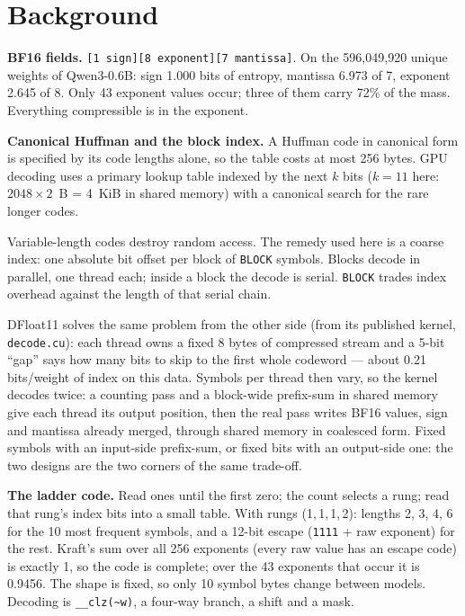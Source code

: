 \documentclass[11pt,a4paper]{article}
\newcommand{\code}[1]{\texttt{#1}}
\newcommand{\B}[1]{\textbf{#1}}
\begin{document}
\section{Background}

\B{BF16 fields.} \code{[1 sign][8 exponent][7 mantissa]}. On the 596,049,920 unique weights of Qwen3-0.6B: sign 1.000 bits of entropy, mantissa 6.973 of 7, exponent 2.645 of 8. Only 43 exponent values occur; three of them carry 72\% of the mass. Everything compressible is in the exponent.

\B{Canonical Huffman and the block index.} A Huffman code \cite{huffman} in canonical form \cite{canonical} is specified by its code lengths alone, so the table costs at most 256 bytes. GPU decoding uses a primary lookup table indexed by the next $k$ bits ($k=11$ here: $2048 \times 2$~B = 4~KiB in shared memory) with a canonical search for the rare longer codes.

Variable-length codes destroy random access. The remedy used here is a coarse index: one absolute bit offset per block of \code{BLOCK} symbols. Blocks decode in parallel, one thread each; inside a block the decode is serial. \code{BLOCK} trades index overhead against the length of that serial chain.

DFloat11 solves the same problem from the other side (from its published kernel, \code{decode.cu}): each thread owns a fixed 8 bytes of compressed stream and a 5-bit ``gap'' says how many bits to skip to the first whole codeword --- about 0.21 bits/weight of index on this data. Symbols per thread then vary, so the kernel decodes twice: a counting pass and a block-wide prefix-sum in shared memory give each thread its output position, then the real pass writes BF16 values, sign and mantissa already merged, through shared memory in coalesced form. Fixed symbols with an input-side prefix-sum, or fixed bits with an output-side one: the two designs are the two corners of the same trade-off.

\B{The ladder code.} Read ones until the first zero; the count selects a rung; read that rung's index bits into a small table. With rungs (1,\,1,\,1,\,2): lengths 2, 3, 4, 6 for the 10 most frequent symbols, and a 12-bit escape (\code{1111} + raw exponent) for the rest. Kraft's sum over all 256 exponents (every raw value has an escape code) is exactly 1, so the code is complete; over the 43 exponents that occur it is 0.9456. The shape is fixed, so only 10 symbol bytes change between models. Decoding is \code{\_\_clz(\textasciitilde w)}, a four-way branch, a shift and a mask.
\end{document}
